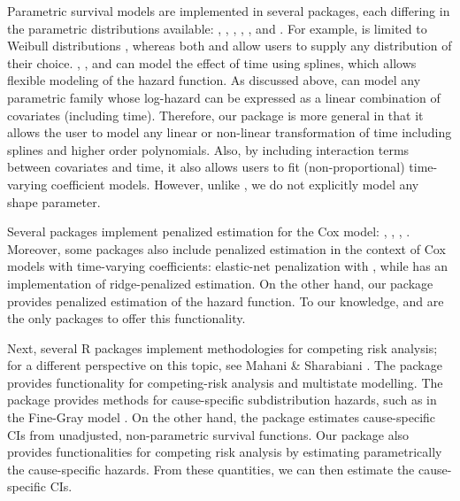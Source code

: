 Parametric survival models are implemented in several packages, each
differing in the parametric distributions available: 
\citeyearpar{mahani2015bayesian}, 
\citeyearpar{flexsurv}, 
\citeyearpar{smoothHazard},  \citeyearpar{clements_liu},
 \citeyearpar{scheike2014estimating}, and
 \citeyearpar{survival-package}. For example,
 is limited to Weibull distributions
\citeyearpar{smoothHazard}, whereas both  and
 allow users to supply any distribution of their choice.
, ,  and  can
model the effect of time using splines, which allows flexible modeling
of the hazard function. As discussed above,  can model any
parametric family whose log-hazard can be expressed as a linear
combination of covariates (including time). Therefore, our package is
more general in that it allows the user to model any linear or
non-linear transformation of time including splines and higher order
polynomials. Also, by including interaction terms between covariates and
time, it also allows users to fit (non-proportional) time-varying
coefficient models. However, unlike , we do not explicitly
model any shape parameter.

Several packages implement penalized estimation for the Cox model:
 \citeyearpar{regpathcox}, 
\citeyearpar{park_hastie},  \citeyearpar{l1penal},
 \citeyearpar{gerds_blanche}. Moreover, some
packages also include penalized estimation in the context of Cox models
with time-varying coefficients: elastic-net penalization with
 \citeyearpar{clements_liu}, while 
\citeyearpar{survival-package} has an implementation of ridge-penalized
estimation. On the other hand, our package  provides
penalized estimation of the hazard function. To our knowledge,
 and  are the only packages to offer this
functionality.

Next, several R packages implement methodologies for competing risk
analysis; for a different perspective on this topic, see Mahani \&
Sharabiani \citeyearpar{mahani2015bayesian}. The package 
provides functionality for competing-risk analysis and multistate
modelling. The package  provides methods for
cause-specific subdistribution hazards, such as in the Fine-Gray model
\citeyearpar{fine1999proportional}. On the other hand, the package
 estimates cause-specific CIs from unadjusted, non-parametric
survival functions. Our package  also provides
functionalities for competing risk analysis by estimating parametrically
the cause-specific hazards. From these quantities, we can then estimate
the cause-specific CIs.

